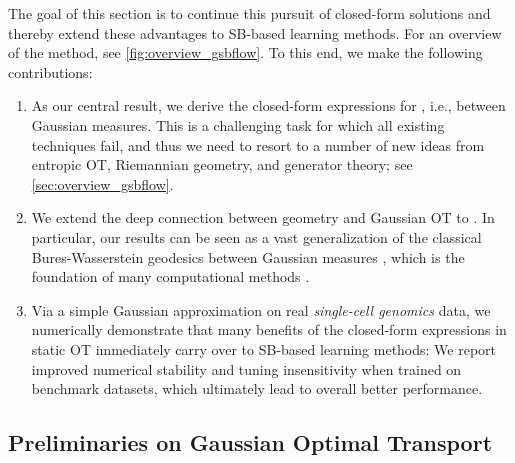 The goal of this section is to continue this pursuit of closed-form solutions and thereby extend these advantages to \acrshort{SB}-based learning methods. For an overview of the method, see \cref{fig:overview_gsbflow}. To this end, we make the following contributions: \vspace{8pt}
\begin{enumerate}[leftmargin=.4cm,itemsep=.0cm,topsep=.0cm]
\item As our central result, we derive the closed-form expressions for , i.e., between Gaussian measures. This is a challenging task for which all existing techniques fail, and thus we need to resort to a number of new ideas from entropic \acrshort{OT}, Riemannian geometry, and generator theory; see \cref{sec:overview_gsbflow}.

\item We extend the deep connection between geometry and Gaussian \acrshort{OT} to . In particular, our results can be seen as a vast generalization of the classical Bures-Wasserstein geodesics between Gaussian measures \citep{takatsu2010wasserstein, bhatia2019bures}, which is the foundation of many computational methods \citep{chewi2020gradient, altschuler2021averaging, han2021riemannian}.

\item Via a simple Gaussian approximation on real \emph{single-cell genomics} data, we numerically demonstrate that many benefits of the closed-form expressions in static \acrshort{OT} immediately carry over to \acrshort{SB}-based learning methods: We report improved numerical stability and tuning insensitivity when trained on benchmark datasets, which ultimately lead to overall better performance.
\end{enumerate}

\subsection{Preliminaries on Gaussian Optimal Transport}
\label{sec:prelim_gsbflow}

